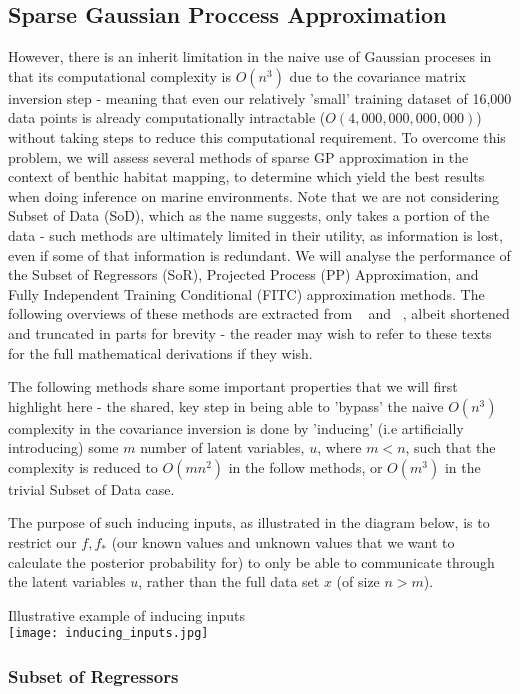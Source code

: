 \documentclass[journal]{IEEEtran}
\begin{document}
    \subsection{Sparse Gaussian Proccess Approximation} However, there is an inherit limitation in the naive use of Gaussian proceses in that its computational complexity is $O(n^3)$ due to the covariance matrix inversion step - meaning that even our relatively 'small' training dataset of 16,000 data points is already computationally intractable ($O(4,000,000,000,000)$) without taking steps to reduce this computational requirement. To overcome this problem, we will assess several methods of sparse GP approximation in the context of benthic habitat mapping, to determine which yield the best results when doing inference on marine environments. Note that we are not considering Subset of Data (SoD), which as the name suggests, only takes a portion of the data - such methods are ultimately limited in their utility, as information is lost, even if some of that information is redundant. We will analyse the performance of the Subset of Regressors (SoR), Projected Process (PP) Approximation, and Fully Independent Training Conditional (FITC) approximation methods. The following overviews of these methods are extracted from ~\citet{candela05} and ~\citet{rasmussen06}, albeit shortened and truncated in parts for brevity - the reader may wish to refer to these texts for the full mathematical derivations if they wish.

    The following methods share some important properties that we will first highlight here - the shared, key step in being able to 'bypass' the naive $O(n^3)$ complexity in the covariance inversion is done by 'inducing' (i.e artificially introducing) some $m$ number of latent variables, $u$, where $m < n$, such that the complexity is reduced to $O(mn^2)$ in the follow methods, or $O(m^3)$ in the trivial Subset of Data case. 

    The purpose of such inducing inputs, as illustrated in the diagram below, is to restrict our $f, f_*$ (our known values and unknown values that we want to calculate the posterior probability for) to only be able to communicate through the latent variables $u$, rather than the full data set $x$ (of size $n > m$).

    {\scriptsize Illustrative example of inducing inputs}\\
    \texttt{[image: inducing\_inputs.jpg]}

    \subsubsection{Subset of Regressors}
\end{document}
